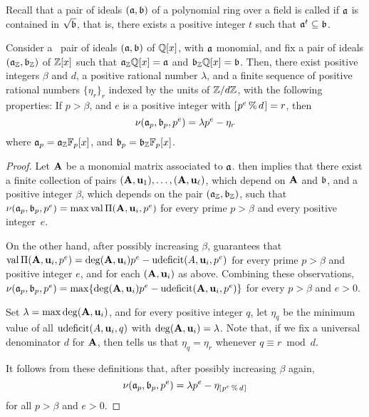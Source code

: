\documentclass{article}
\begin{document}
Recall that a pair of ideals $(\mathfrak{a}, \mathfrak{b})$ of a polynomial ring over a field is called \emph{\compatible} if $\mathfrak{a}$ is contained in $\sqrt{\mathfrak{b}}$, that is, there exists a positive integer $t$ such that $\mathfrak{a}^t \subseteq \mathfrak{b}$.

\begin{corollary}
\label{cor: BMS result}
   Consider a \compatible\ pair of ideals $(\mathfrak{a}, \mathfrak{b})$ of $\mathbb{Q}[x]$, with $\mathfrak{a}$ monomial, and fix a pair of ideals $(\mathfrak{a}_{\mathbb{Z}}, \mathfrak{b}_{\mathbb{Z}})$ of $\mathbb{Z}[x]$ such that $\mathfrak{a}_{\mathbb{Z}} \mathbb{Q}[x] = \mathfrak{a}$ and $\mathfrak{b}_{\mathbb{Z}} \mathbb{Q}[x] = \mathfrak{b}$.    Then, there exist positive integers $\beta$ and $d$, a positive rational number $\lambda$, and a finite sequence of positive rational numbers $\{ \eta_r \}_r$ indexed by the units of $\mathbb{Z}/d\mathbb{Z}$, with the following properties\textup:  If $p > \beta$, and $e$ is a positive integer with $[ \hspace{.01in} p^e \, \% \, d \hspace{.01in} ] = r$, then 
\[ \nu(\mathfrak{a}_p, \mathfrak{b}_p, p^e) = \lambda p^e - \eta_r \] where $\mathfrak{a}_p = \mathfrak{a}_{\mathbb{Z}} \mathbb{F}_p[x]$, and $\mathfrak{b}_p = \mathfrak{b}_{\mathbb{Z}} \mathbb{F}_p[x]$.
\end{corollary}

\begin{proof}
   Let $\mathbf{A}$ be a monomial matrix associated to $\mathfrak{a}$.
    then implies that there exist a finite collection of pairs $(\mathbf{A}, \mathbf{u}_1), \ldots, (\mathbf{A}, \mathbf{u}_{\ell})$, which depend on $\mathbf{A}$ and $\mathfrak{b}$, and a positive integer $\beta$, which depends on the pair $(\mathfrak{a}_{\mathbb{Z}}, \mathfrak{b}_{\mathbb{Z}})$,  such that $\nu(\mathfrak{a}_p, \mathfrak{b}_p, p^e) = \max \operatorname{val} \Pi(\mathbf{A}, \mathbf{u}_i, p^e)$  for every prime $p > \beta$ and every positive integer~$e$.  

On the other hand, after possibly increasing $\beta$,  guarantees that 
$\operatorname{val} \Pi(\mathbf{A}, \mathbf{u}_i, p^e) = \operatorname{deg}(\mathbf{A}, \mathbf{u}_i) p^e - \operatorname{udeficit}(A, \mathbf{u}_i, p^e)$  for every prime $p > \beta$ and positive integer $e$, and for each $(\mathbf{A}, \mathbf{u}_i)$ as above.   Combining these observations, 
$\nu(\mathfrak{a}_p, \mathfrak{b}_p, p^e) = \max  \{ \operatorname{deg}(\mathbf{A}, \mathbf{u}_i) p^e - \operatorname{udeficit}(\mathbf{A}, \mathbf{u}_i, p^e) \}$ for every $p > \beta$ and $e > 0$.  

Set $\lambda = \max \operatorname{deg}(\mathbf{A}, \mathbf{u}_i)$, and for every positive integer $q$, let $\eta_{q}$ be the minimum value of all $\operatorname{udeficit}(A, \mathbf{u}_i, q)$ with $ \operatorname{deg}(\mathbf{A}, \mathbf{u}_i) = \lambda$.  Note that, if we fix a universal denominator $d$ for $\mathbf{A}$, then  tells us that $\eta_q = \eta_r$ whenever $q \equiv r \bmod d$.  

It follows from these definitions that, after possibly increasing $\beta$ again, 
\[ \nu(\mathfrak{a}_p, \mathfrak{b}_p, p^e) = \lambda p^e - \eta_{[ \hspace{.01in} p^e \, \% \, d \hspace{.01in} ]} \] 
for all $p > \beta$ and $e > 0$.
\end{proof}
\end{document}
